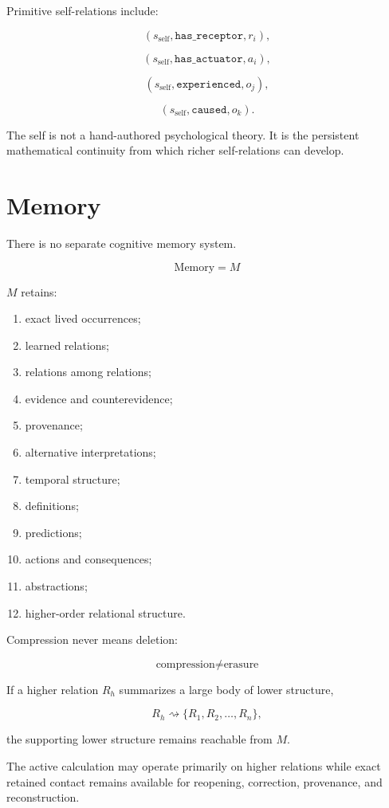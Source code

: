 \documentclass[11pt]{article}
\begin{document}
Primitive self-relations include:

\[
(s_{\text{self}},\texttt{has\_receptor},r_i),
\]

\[
(s_{\text{self}},\texttt{has\_actuator},a_i),
\]

\[
(s_{\text{self}},\texttt{experienced},o_j),
\]

\[
(s_{\text{self}},\texttt{caused},o_k).
\]

The self is not a hand-authored psychological theory.
It is the persistent mathematical continuity from which richer self-relations can develop.

\section{Memory}

There is no separate cognitive memory system.

\[
\boxed{\text{Memory}=M}
\]

$M$ retains:

\begin{enumerate}[leftmargin=2em]
    \item exact lived occurrences;
    \item learned relations;
    \item relations among relations;
    \item evidence and counterevidence;
    \item provenance;
    \item alternative interpretations;
    \item temporal structure;
    \item definitions;
    \item predictions;
    \item actions and consequences;
    \item abstractions;
    \item higher-order relational structure.
\end{enumerate}

Compression never means deletion:

\[
\boxed{\text{compression}\neq\text{erasure}}
\]

If a higher relation $R_h$ summarizes a large body of lower structure,

\[
R_h \rightsquigarrow \{R_1,R_2,\ldots,R_n\},
\]

the supporting lower structure remains reachable from $M$.

The active calculation may operate primarily on higher relations while exact retained contact remains available for reopening, correction, provenance, and reconstruction.
\end{document}
